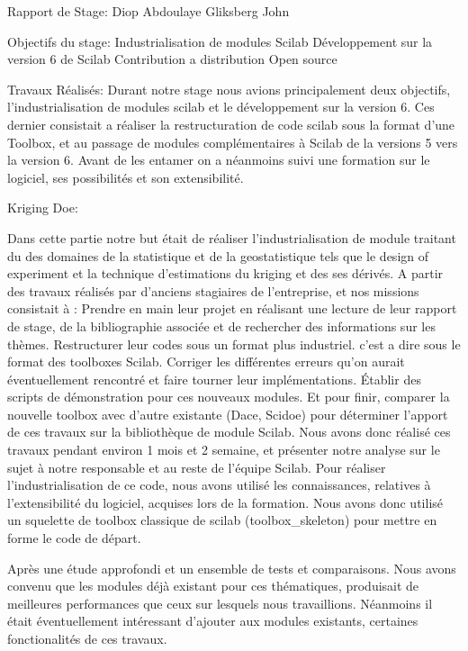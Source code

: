 Rapport de Stage:
Diop Abdoulaye
Gliksberg John

Objectifs du stage:
Industrialisation de modules Scilab
Développement sur la version 6 de Scilab
Contribution a distribution Open source

Travaux Réalisés:
Durant notre stage nous avions principalement deux objectifs, l’industrialisation de modules scilab et le développement sur la version 6. Ces dernier consistait a réaliser la restructuration de code scilab sous la format d’une Toolbox, et au passage de modules complémentaires à Scilab de la versions 5 vers la version 6. Avant de les entamer on a néanmoins suivi une formation sur le logiciel, ses possibilités et son extensibilité.

Kriging Doe:

Dans cette partie notre but était de réaliser l’industrialisation de module traitant du des domaines de la statistique et de la geostatistique tels que le design of experiment et la technique d’estimations du kriging et des ses dérivés.
A partir des travaux réalisés par d’anciens stagiaires de l’entreprise, et nos missions consistait à :
Prendre en main leur projet en réalisant une lecture de leur rapport de stage, de la bibliographie associée et de rechercher des informations sur les thèmes.
Restructurer leur codes sous un format plus industriel. c’est a dire sous le format des toolboxes Scilab.
Corriger les différentes erreurs qu’on aurait éventuellement rencontré et faire tourner leur implémentations.
Établir des scripts de démonstration pour ces nouveaux modules.
Et pour finir, comparer la nouvelle toolbox avec d’autre existante (Dace, Scidoe) pour déterminer l’apport de ces travaux sur la bibliothèque de module Scilab.
Nous avons donc réalisé ces travaux pendant environ 1 mois et 2 semaine, et présenter notre analyse sur le sujet à notre responsable et au reste de l’équipe Scilab.
Pour réaliser l’industrialisation de ce code, nous avons utilisé les connaissances, relatives à l’extensibilité du logiciel, acquises lors de la formation. Nous avons donc utilisé un squelette de toolbox classique de scilab (toolbox_skeleton) pour mettre en forme le code de départ. 

Après une étude approfondi et un ensemble de tests et comparaisons. Nous avons convenu que les modules déjà existant pour ces thématiques, produisait de meilleures performances que ceux sur lesquels nous travaillions.
Néanmoins il était éventuellement intéressant d’ajouter aux modules existants, certaines fonctionalités de ces travaux.



